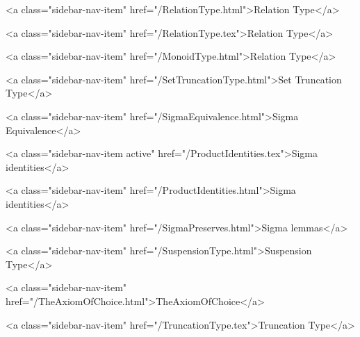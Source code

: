       
    
      
        
          <a class="sidebar-nav-item" href="/RelationType.html">Relation Type</a>
        
      
    
      
        
          <a class="sidebar-nav-item" href="/RelationType.tex">Relation Type</a>
        
      
    
      
        
          <a class="sidebar-nav-item" href="/MonoidType.html">Relation Type</a>
        
      
    
      
        
          <a class="sidebar-nav-item" href="/SetTruncationType.html">Set Truncation Type</a>
        
      
    
      
        
          <a class="sidebar-nav-item" href="/SigmaEquivalence.html">Sigma Equivalence</a>
        
      
    
      
        
          <a class="sidebar-nav-item active" href="/ProductIdentities.tex">Sigma identities</a>
        
      
    
      
        
          <a class="sidebar-nav-item" href="/ProductIdentities.html">Sigma identities</a>
        
      
    
      
        
          <a class="sidebar-nav-item" href="/SigmaPreserves.html">Sigma lemmas</a>
        
      
    
      
        
          <a class="sidebar-nav-item" href="/SuspensionType.html">Suspension Type</a>
        
      
    
      
        
          <a class="sidebar-nav-item" href="/TheAxiomOfChoice.html">TheAxiomOfChoice</a>
        
      
    
      
        
          <a class="sidebar-nav-item" href="/TruncationType.tex">Truncation Type</a>
        
